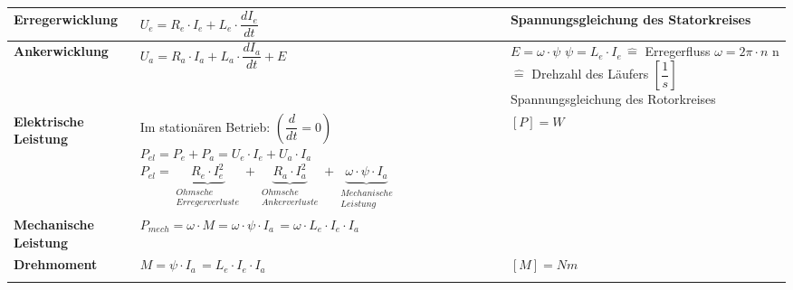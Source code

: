 \\
\renewcommand{\arraystretch}{2.5}
\begin{tabular}[b]{| C{4cm} | P{7cm} | P{7cm} |}
\hline
\textbf{Erregerwicklung}	& $U_e = R_e\cdot I_e + L_e\cdot\dfrac{dI_e}{dt}$ & Spannungsgleichung des Statorkreises\\
\hline
\textbf{Ankerwicklung}	& $U_a = R_a \cdot I_a + L_a \cdot \dfrac{dI_a}{dt} + E$ & $E = \omega\cdot\psi$ \qquad $\psi = L_e\cdot I_e \, \widehat{=}$ Erregerfluss \newline \newline $\omega = 2\pi\cdot n$ \newline \quad n $\widehat{=}$ Drehzahl des Läufers $\left[\dfrac{1}{s}\right]$\newline \newline Spannungsgleichung des Rotorkreises\\
\hline
\textbf{Elektrische Leistung} & Im stationären Betrieb: \quad $\left(\dfrac{d}{dt} = 0\right)$ \newline \newline $P_{el} = P_e + P_a = U_e\cdot I_e + U_a\cdot I_a$ \newline \newline $P_{el} = \underbrace{R_e\cdot I_e^2}_{\substack{Ohmsche \\ Erregerverluste}} + \underbrace{R_a\cdot I_a^2}_{\substack{Ohmsche \\ Ankerverluste}} + \underbrace{\omega\cdot\psi\cdot I_a}_{\substack{Mechanische\\Leistung}}$ \newline & $[P] = W$ \\
\hline
\textbf{Mechanische Leistung} & $P_{mech} = \omega\cdot M = \omega\cdot\psi\cdot I_a\, = \omega\cdot L_e \cdot I_e \cdot I_a$ & \\
\hline
\textbf{Drehmoment} & $M = \psi\cdot I_a\, = L_e\cdot I_e\cdot I_a$ & $[M] = Nm$ \\
	\lasthline
\end{tabular}

\newpage
